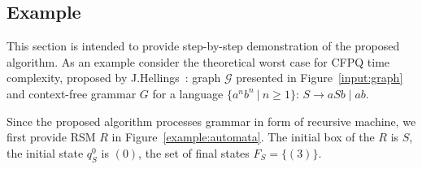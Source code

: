 \subsection{Example}
\label{example:section}

This section is intended to provide step-by-step demonstration of the proposed algorithm. 
As an example consider the theoretical worst case for CFPQ time complexity, proposed by J.Hellings~\cite{hellings2015querying}: graph $\mathcal{G}$ presented in Figure~\ref{input:graph} and context-free grammar $G$ for a language $\{a^n b^n~|~n \geq 1\}$: $ S \to a S b \mid a b$.

Since the proposed algorithm processes grammar in form of recursive machine, we first provide RSM $R$ in Figure~\ref{example:automata}. The initial box of the $R$ is $S$, the initial state $q_S^0$ is $(0)$, the set of final states $F_S = \{ (3) \}$.

